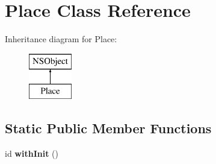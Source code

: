 \hypertarget{interface_place}{
\section{\-Place \-Class \-Reference}
\label{interface_place}
}
\-Inheritance diagram for \-Place\-:\begin{figure}[H]
\begin{center}
\leavevmode
\includegraphics[height=2.000000cm]{interface_place}
\end{center}
\end{figure}
\subsection*{\-Static \-Public \-Member \-Functions}
\begin{DoxyCompactItemize}
\item 
\hypertarget{interface_place_a84410078d1276910ffdd5c7f3d04d0b5}{
id {\bfseries with\-Init} ()}
\label{interface_place_a84410078d1276910ffdd5c7f3d04d0b5}

\end{DoxyCompactItemize}
